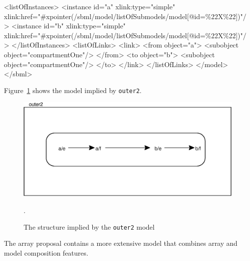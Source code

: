\documentclass{cekarticle}
\begin{document}
\begin{example}
        <listOfInstances>
            <instance
                id="a" 
                xlink:type="simple"
                xlink:href="#xpointer(/sbml/model/listOfSubmodels/model[@id=\%22X\%22])"/>
            <instance
                id="b" 
                xlink:type="simple"
                xlink:href="#xpointer(/sbml/model/listOfSubmodels/model[@id=\%22X\%22])"/>
        </listOfInstances>
        <listOfLinks>
            <link>
                <from object="a">
                    <subobject object="compartmentOne"/>
                </from>
                <to object="b">
                    <subobject object="compartmentOne"/>
                </to>
            </link>
        </listOfLinks>
    </model>
</sbml>
\end{example}

Figure~\ref{fig:egdirectlinks-implied} shows the model implied by \texttt{outer2}.
\begin{figure}[h]
  \vspace*{8pt}
  \centering
  \includegraphics[scale = 0.7]{egdirectlinks-implied}
  \caption{The structure implied by the \texttt{outer2} model}.
  \label{fig:egdirectlinks-implied}
\end{figure}

The array proposal contains a more extensive model that combines
array and model composition features.




\end{document}
